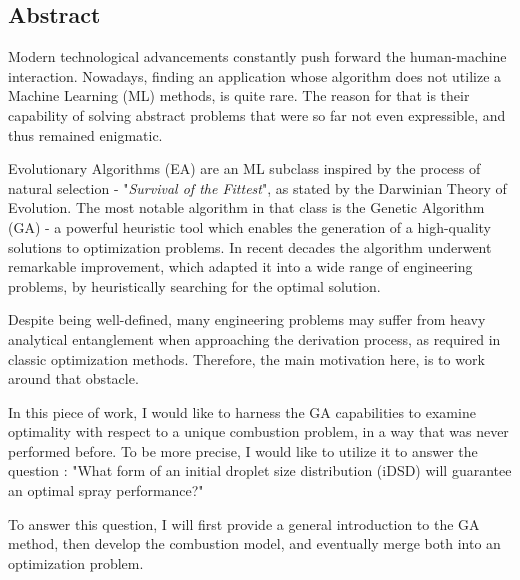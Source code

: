 \documentclass[12pt]{article}
\renewcommand{\baselinestretch}{1.2}
\numberwithin{equation}{section}
\begin{document}
\begin{flushleft} 
\begingroup
\hypersetup{linkcolor=black}
\renewcommand{\baselinestretch}{0.85}\normalsize
\tableofcontents 
\renewcommand{\baselinestretch}{1.0}\normalsize
\endgroup 				%
\newpage


\subsection*{Abstract}  
Modern technological advancements constantly push forward the human-machine interaction. Nowadays, finding an application whose algorithm does not utilize a Machine Learning (ML) methods, is quite rare. The reason for that is their capability of solving abstract problems that were so far not even expressible, and thus remained enigmatic. 

Evolutionary Algorithms (EA) are an ML subclass inspired by the process of natural selection - "\textit{Survival of the Fittest}", as stated by the Darwinian Theory of Evolution. The most notable algorithm in that class is the Genetic Algorithm (GA) - a powerful heuristic tool which enables the generation of a high-quality solutions to optimization problems. In recent decades the algorithm underwent remarkable improvement, which adapted it into a wide range of engineering problems, by heuristically searching for the optimal solution.

Despite being well-defined, many engineering problems may suffer from heavy analytical entanglement when approaching the derivation process, as required in classic optimization methods. Therefore, the main motivation here, is to work around that obstacle.

In this piece of work, I would like to harness the GA capabilities to examine optimality with respect to a unique combustion problem, in a way that was never performed before. To be more precise, I would like to utilize it to answer the question : "What form of an initial droplet size distribution (iDSD) will guarantee an optimal spray performance?"

To answer this question, I will first provide a general introduction to the GA method, then develop the combustion model, and eventually merge both into an optimization problem.


\end{flushleft}
\end{document}
